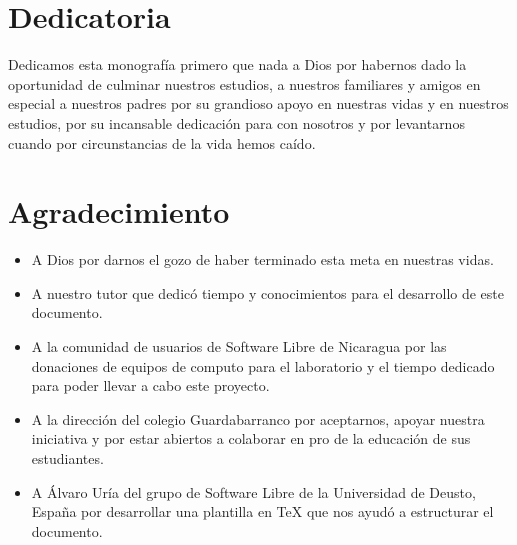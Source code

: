 \section{Dedicatoria}
	Dedicamos esta monograf\'ia primero que nada a Dios por habernos dado la oportunidad de culminar nuestros estudios, 
	a nuestros familiares y amigos en especial a nuestros padres por su grandioso apoyo en nuestras vidas y en nuestros 
	estudios, por su incansable dedicaci\'on para con nosotros y por levantarnos cuando por circunstancias de la vida 
	hemos ca\'ido.

\newpage

\section{Agradecimiento}

	\begin{itemize}
		 \item A Dios por darnos el gozo de haber terminado esta meta en nuestras vidas.
		 \item A nuestro tutor que dedic\'o tiempo y conocimientos para el desarrollo de este documento.
		 \item A la comunidad de usuarios de Software Libre de Nicaragua por las donaciones de equipos de computo para el laboratorio y el tiempo dedicado para poder llevar a cabo este proyecto.
		 \item A la direcci\'on del colegio Guardabarranco por aceptarnos, apoyar nuestra iniciativa y por estar abiertos a colaborar en pro de la educaci\'on de sus estudiantes.
		 \item A \'Alvaro Ur\'ia del grupo de Software Libre de la Universidad de Deusto, Espa\~na por desarrollar una plantilla en \TeX{} que nos ayud\'o a estructurar el documento.
	\end{itemize}

